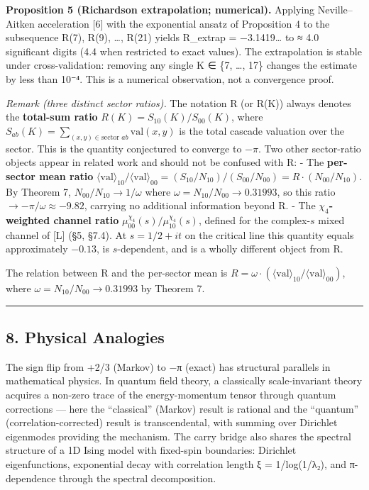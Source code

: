 \documentclass[
  11pt,
]{article}
\begin{document}
\textbf{Proposition 5 (Richardson extrapolation; numerical).} Applying
Neville--Aitken acceleration {[}6{]} with the exponential ansatz of Proposition
4 to the subsequence R(7), R(9), \ldots, R(21) yields R\_extrap =
−3.1419\ldots{} to ≈ 4.0 significant digits (4.4 when restricted to exact
values). The extrapolation is stable under cross-validation: removing any single
K ∈ \{7, \ldots, 17\} changes the estimate by less than 10⁻⁴. This is a
numerical observation, not a convergence proof.

\emph{Remark (three distinct sector ratios).} The notation R (or R(K)) always
denotes the \textbf{total-sum ratio} \(R(K) = S_{10}(K)/S_{00}(K)\), where
\(S_{ab}(K) = \sum_{(x,y) \in \text{sector } ab} \text{val}(x,y)\) is the total
cascade valuation over the sector. This is the quantity conjectured to converge
to \(-\pi\). Two other sector-ratio objects appear in related work and should
not be confused with R: - The \textbf{per-sector mean ratio}
\(\langle\text{val}\rangle_{10}/\langle\text{val}\rangle_{00} = (S_{10}/N_{10})/(S_{00}/N_{00}) = R \cdot (N_{00}/N_{10})\).
By Theorem 7, \(N_{00}/N_{10} \to 1/\omega\) where
\(\omega = N_{10}/N_{00} \to 0.31993\), so this ratio
\(\to -\pi/\omega \approx -9.82\), carrying no additional information beyond R.
- The \textbf{\(\chi_4\)-weighted channel ratio}
\(\mu_{00}^{\chi_4}(s)/\mu_{10}^{\chi_4}(s)\), defined for the complex-\(s\)
mixed channel of {[}L{]} (§5, §7.4). At \(s = 1/2 + it\) on the critical line
this quantity equals approximately \(-0.13\), is \(s\)-dependent, and is a
wholly different object from R.

The relation between R and the per-sector mean is
\(R = \omega \cdot (\langle\text{val}\rangle_{10}/\langle\text{val}\rangle_{00})\),
where \(\omega = N_{10}/N_{00} \to 0.31993\) by Theorem 7.

\begin{center}\rule{0.5\linewidth}{0.5pt}\end{center}

\newpage

\subsection{8. Physical Analogies}\label{physical-analogies}

The sign flip from +2/3 (Markov) to −π (exact) has structural parallels in
mathematical physics. In quantum field theory, a classically scale-invariant
theory acquires a non-zero trace of the energy-momentum tensor through quantum
corrections --- here the ``classical'' (Markov) result is rational and the
``quantum'' (correlation-corrected) result is transcendental, with summing over
Dirichlet eigenmodes providing the mechanism. The carry bridge also shares the
spectral structure of a 1D Ising model with fixed-spin boundaries: Dirichlet
eigenfunctions, exponential decay with correlation length ξ = 1/log(1/λ₂), and
π-dependence through the spectral decomposition.
\end{document}
